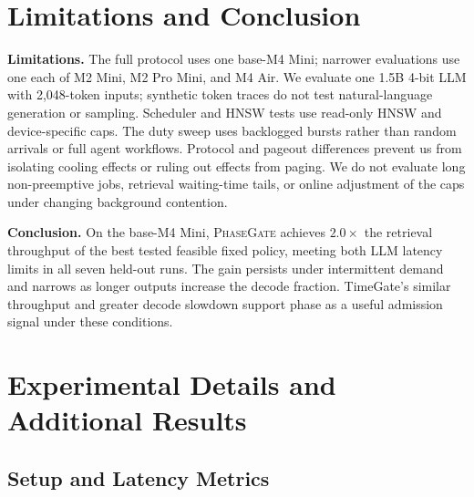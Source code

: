 \documentclass{article}
\newcommand{\system}{\textsc{PhaseGate}\xspace}
\begin{document}
\section{Limitations and Conclusion}

\textbf{Limitations.}
The full protocol uses one base-M4 Mini; narrower evaluations use one each of M2 Mini, M2 Pro Mini, and M4 Air.
We evaluate one 1.5B 4-bit LLM with 2,048-token inputs; synthetic token traces do not test natural-language generation or sampling.
Scheduler and HNSW tests use read-only HNSW and device-specific caps.
The duty sweep uses backlogged bursts rather than random arrivals or full agent workflows.
Protocol and pageout differences prevent us from isolating cooling effects or ruling out effects from paging.
We do not evaluate long non-preemptive jobs, retrieval waiting-time tails, or online adjustment of the caps under changing background contention.

\textbf{Conclusion.}
On the base-M4 Mini, \system achieves $2.0\times$ the retrieval throughput of the best tested feasible fixed policy, meeting both LLM latency limits in all seven held-out runs.
The gain persists under intermittent demand and narrows as longer outputs increase the decode fraction.
TimeGate's similar throughput and greater decode slowdown support phase as a useful admission signal under these conditions.

\clearpage
{\small


}

\clearpage
\appendix
\setcounter{table}{0}
\renewcommand{\thetable}{A\arabic{table}}
\renewcommand{\theHtable}{appendix.\Alph{section}.\arabic{table}}
\setcounter{figure}{0}
\renewcommand{\thefigure}{A\arabic{figure}}
\renewcommand{\theHfigure}{appendix.\Alph{section}.\arabic{figure}}
\section{Experimental Details and Additional Results}
\label{app:experimental-details}

\subsection{Setup and Latency Metrics}
\label{app:metrics}
\end{document}
